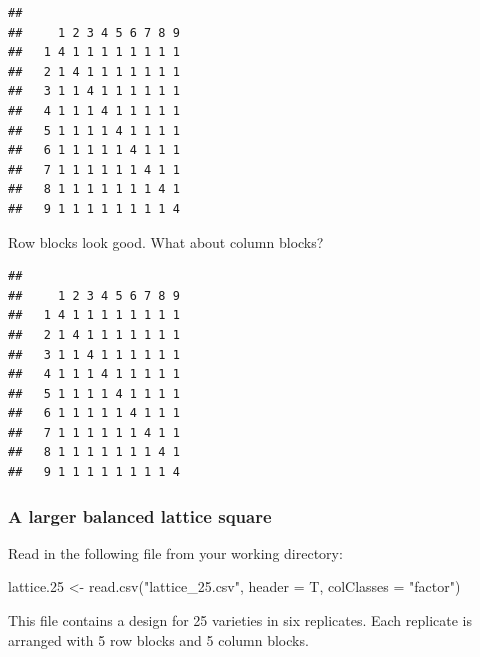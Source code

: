 \documentclass[
]{book}
\newenvironment{Shaded}{\begin{snugshade}}{\end{snugshade}}
\newcommand{\AttributeTok}[1]{\textcolor[rgb]{0.77,0.63,0.00}{#1}}
\newcommand{\FloatTok}[1]{\textcolor[rgb]{0.00,0.00,0.81}{#1}}
\newcommand{\FunctionTok}[1]{\textcolor[rgb]{0.00,0.00,0.00}{#1}}
\newcommand{\NormalTok}[1]{#1}
\newcommand{\OtherTok}[1]{\textcolor[rgb]{0.56,0.35,0.01}{#1}}
\newcommand{\SpecialCharTok}[1]{\textcolor[rgb]{0.00,0.00,0.00}{#1}}
\newcommand{\StringTok}[1]{\textcolor[rgb]{0.31,0.60,0.02}{#1}}
\begin{document}
\begin{verbatim}
##    
##     1 2 3 4 5 6 7 8 9
##   1 4 1 1 1 1 1 1 1 1
##   2 1 4 1 1 1 1 1 1 1
##   3 1 1 4 1 1 1 1 1 1
##   4 1 1 1 4 1 1 1 1 1
##   5 1 1 1 1 4 1 1 1 1
##   6 1 1 1 1 1 4 1 1 1
##   7 1 1 1 1 1 1 4 1 1
##   8 1 1 1 1 1 1 1 4 1
##   9 1 1 1 1 1 1 1 1 4
\end{verbatim}

Row blocks look good. What about column blocks?

\begin{Shaded}
\end{Shaded}

\begin{verbatim}
##    
##     1 2 3 4 5 6 7 8 9
##   1 4 1 1 1 1 1 1 1 1
##   2 1 4 1 1 1 1 1 1 1
##   3 1 1 4 1 1 1 1 1 1
##   4 1 1 1 4 1 1 1 1 1
##   5 1 1 1 1 4 1 1 1 1
##   6 1 1 1 1 1 4 1 1 1
##   7 1 1 1 1 1 1 4 1 1
##   8 1 1 1 1 1 1 1 4 1
##   9 1 1 1 1 1 1 1 1 4
\end{verbatim}

\hypertarget{a-larger-balanced-lattice-square}{%
\subsubsection{A larger balanced lattice square}\label{a-larger-balanced-lattice-square}}

Read in the following file from your working directory:

\begin{Shaded}
\begin{Highlighting}[]
\NormalTok{lattice}\FloatTok{.25} \OtherTok{\textless{}{-}} \FunctionTok{read.csv}\NormalTok{(}\StringTok{"lattice\_25.csv"}\NormalTok{, }\AttributeTok{header =}\NormalTok{ T, }\AttributeTok{colClasses =} \StringTok{"factor"}\NormalTok{)}
\end{Highlighting}
\end{Shaded}

This file contains a design for 25 varieties in six replicates. Each replicate is arranged with 5 row blocks and 5 column blocks.
\end{document}
